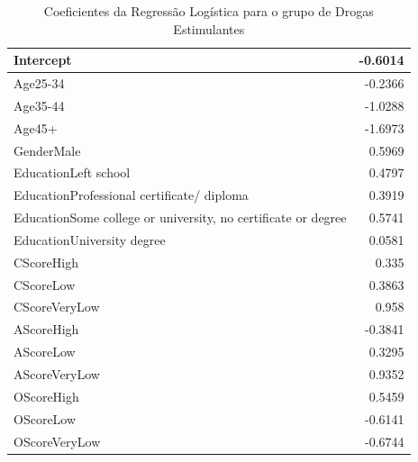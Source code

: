 \documentclass[
	article,			%
	11pt,				%
	oneside,			%
	a4paper,			%
	english,			%
	brazil,				%
	sumario=tradicional
	]{abntex2}
\begin{document}
\begin{table}[H]
\centering
\begin{tabular}{|l|r|}
\hline
Intercept                                                     & -0.6014 \\ \hline

Age25-34                                                      & -0.2366 \\ \hline
Age35-44                                                      & -1.0288 \\ \hline
Age45+                                                        & -1.6973 \\ \hline
GenderMale                                                    & 0.5969  \\ \hline
EducationLeft school                                          & 0.4797  \\ \hline
EducationProfessional certificate/ diploma                    & 0.3919  \\ \hline
EducationSome college or university, no certificate or degree & 0.5741 \\ \hline
EducationUniversity degree                                    & 0.0581  \\ \hline

CScoreHigh                                                    & 0.335 \\ \hline
CScoreLow                                                     & 0.3863  \\ \hline
CScoreVeryLow                                                 & 0.958  \\ \hline

AScoreHigh                                                    & -0.3841 \\ \hline
AScoreLow                                                     & 0.3295  \\ \hline
AScoreVeryLow                                                 & 0.9352  \\ \hline

OScoreHigh                                                    & 0.5459  \\ \hline
OScoreLow                                                     & -0.6141 \\ \hline
OScoreVeryLow                                                 & -0.6744 \\ \hline
\end{tabular}
\caption{Coeficientes da Regressão Logística para o grupo de Drogas Estimulantes}
\label{coef_reglog_stimulants}
\end{table}
\end{document}
